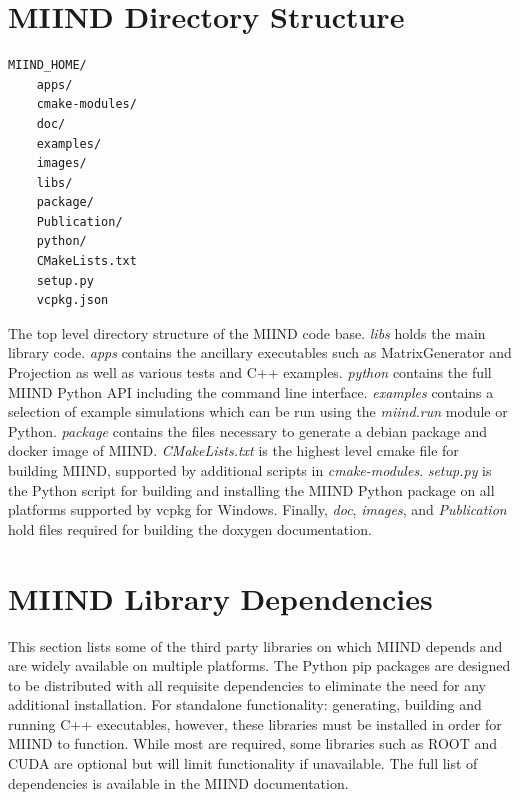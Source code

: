 \documentclass[utf8]{frontiers_suppmat} %
\begin{document}
\onecolumn
{}

\title[Supplementary Material]{{}}

\maketitle

\section {MIIND Directory Structure}
\label{directorystructure}

\begin{lstlisting}
MIIND_HOME/
    apps/
    cmake-modules/
    doc/
    examples/
    images/
    libs/
    package/
    Publication/
    python/
    CMakeLists.txt
    setup.py
    vcpkg.json
\end{lstlisting}

The top level directory structure of the MIIND code base. \textit{libs} holds the main library code. \textit{apps} contains the ancillary executables such as MatrixGenerator and Projection as well as various tests and C++ examples. \textit{python} contains the full MIIND Python API including the command line interface. \textit{examples} contains a selection of example simulations which can be run using the \textit{miind.run} module or Python. \textit{package} contains the files necessary to generate a debian package and docker image of MIIND. \textit{CMakeLists.txt} is the highest level cmake file for building MIIND, supported by additional scripts in \textit{cmake-modules}. \textit{setup.py} is the Python script for building and installing the MIIND Python package on all platforms supported by vcpkg for Windows. Finally, \textit{doc}, \textit{images}, and \textit{Publication} hold files required for building the doxygen documentation. 

\section{MIIND Library Dependencies}
\label{miinddependencies}
This section lists some of the third party libraries on which MIIND depends and are widely available on multiple platforms. The Python pip packages are designed to be distributed with all requisite dependencies to eliminate the need for any additional installation. For standalone functionality: generating, building and running C++ executables, however, these libraries must be installed in order for MIIND to function. While most are required, some libraries such as ROOT and CUDA are optional but will limit functionality if unavailable. The full list of dependencies is available in the MIIND documentation.\\
\end{document}
